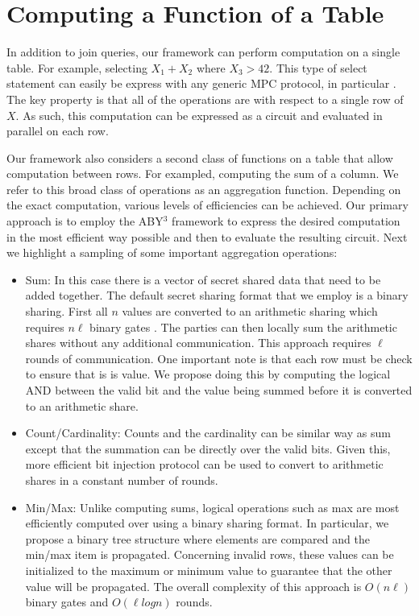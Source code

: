 \section{Computing a Function of a Table}

In addition to join queries, our framework can perform computation on a single table. For example, selecting $X_1+X_2$  where $X_3>42$. This type of select statement can easily be express with any generic MPC protocol, in particular \cite{aby3, highthroughput}. The key property is that all of the operations are with respect to a single row of $X$. As such, this computation can be expressed as a circuit and evaluated in parallel on each row. 

Our framework also considers a second class of functions on a table that allow computation between rows. For exampled, computing the sum of a column. We refer to this broad class of operations as an aggregation function. Depending on the exact computation, various levels of efficiencies can be achieved. Our primary approach is to employ the ABY$^3$ framework \cite{aby3} to express the desired computation in the most efficient way possible and then to evaluate the resulting circuit. Next we highlight a sampling of some important aggregation operations:
\begin{itemize}
	\item Sum: In this case there is a vector of secret shared data that need to be added together.  The default secret sharing format that we employ is a binary sharing. First all $n$ values are converted to an arithmetic sharing which requires $n\ell$ binary gates \cite{aby3}. The parties can then locally sum the arithmetic shares without any additional communication. This approach requires $\ell$ rounds of communication. One important note is that each row must be check to ensure that is is value. We propose doing this by computing the logical AND between the valid bit and the value being summed before it is converted to an arithmetic share.
	
	\item Count/Cardinality: Counts and the cardinality can be similar way as sum except that the summation can be directly over the valid bits. Given this, more efficient bit injection protocol\cite{aby3} can be used to convert to arithmetic shares in a constant number of rounds.
	
	\item  Min/Max: Unlike computing sums, logical operations such as max are most efficiently computed over using a binary sharing format. In particular, we propose a binary tree structure where elements are compared and the min/max item is propagated. Concerning invalid rows, these values can be initialized to the maximum or minimum value to guarantee that the other value will be propagated. The overall complexity of this approach is $O(n\ell)$ binary gates and $O(\ell log n)$ rounds.
\end{itemize}

